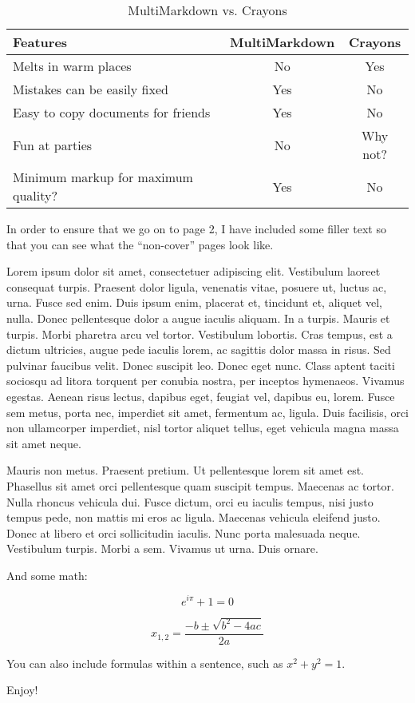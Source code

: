 \begin{table}[htbp]
\begin{minipage}{\linewidth}
\setlength{\tymax}{0.5\linewidth}
\centering
\small
\caption{MultiMarkdown vs. Crayons}
\label{multimarkdownvs.crayons}
\begin{tabular}{@{}lcc@{}} \toprule
Features&MultiMarkdown&Crayons\\
\midrule
Melts in warm places&No&Yes\\
Mistakes can be easily fixed&Yes&No\\
Easy to copy documents for friends&Yes&No\\
Fun at parties&No&Why not?\\

\midrule
Minimum markup for maximum quality?&Yes&No\\

\bottomrule

\end{tabular}
\end{minipage}
\end{table}


In order to ensure that we go on to page 2, I have included some filler text
so that you can see what the ``non-cover'' pages look like.

Lorem ipsum dolor sit amet, consectetuer adipiscing elit. Vestibulum laoreet
consequat turpis. Praesent dolor ligula, venenatis vitae, posuere ut, luctus
ac, urna. Fusce sed enim. Duis ipsum enim, placerat et, tincidunt et, aliquet
vel, nulla. Donec pellentesque dolor a augue iaculis aliquam. In a turpis.
Mauris et turpis. Morbi pharetra arcu vel tortor. Vestibulum lobortis. Cras
tempus, est a dictum ultricies, augue pede iaculis lorem, ac sagittis dolor
massa in risus. Sed pulvinar faucibus velit. Donec suscipit leo. Donec eget
nunc. Class aptent taciti sociosqu ad litora torquent per conubia nostra, per
inceptos hymenaeos. Vivamus egestas. Aenean risus lectus, dapibus eget,
feugiat vel, dapibus eu, lorem. Fusce sem metus, porta nec, imperdiet sit
amet, fermentum ac, ligula. Duis facilisis, orci non ullamcorper imperdiet,
nisl tortor aliquet tellus, eget vehicula magna massa sit amet neque.

Mauris non metus. Praesent pretium. Ut pellentesque lorem sit amet est.
Phasellus sit amet orci pellentesque quam suscipit tempus. Maecenas ac tortor.
Nulla rhoncus vehicula dui. Fusce dictum, orci eu iaculis tempus, nisi justo
tempus pede, non mattis mi eros ac ligula. Maecenas vehicula eleifend justo.
Donec at libero et orci sollicitudin iaculis. Nunc porta malesuada neque.
Vestibulum turpis. Morbi a sem. Vivamus ut urna. Duis ornare.

And some math:

\[ {e}^{i\pi }+1=0 \]

\[ {x}_{1,2}=\frac{-b\pm \sqrt{{b}^{2}-4ac}}{2a} \]

You can also include formulas within a sentence, such as
${x}^{2}+{y}^{2}=1$.

Enjoy!




